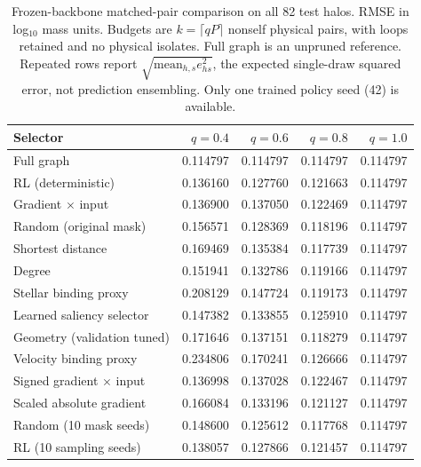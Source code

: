 \begin{table}[t]
\centering
\caption{Frozen-backbone matched-pair comparison on all 82 test halos. RMSE in log$_{10}$ mass units. Budgets are $k=\lceil qP\rceil$ nonself physical pairs, with loops retained and no physical isolates. Full graph is an unpruned reference. Repeated rows report $\sqrt{\mathrm{mean}_{h,s} e_{hs}^2}$, the expected single-draw squared error, not prediction ensembling. Only one trained policy seed (42) is available.}
\label{tab:baseline-robustness}
\begin{tabular}{lrrrr}
\toprule
Selector & $q=0.4$ & $q=0.6$ & $q=0.8$ & $q=1.0$ \\
\midrule
Full graph & 0.114797 & 0.114797 & 0.114797 & 0.114797 \\
RL (deterministic) & 0.136160 & 0.127760 & 0.121663 & 0.114797 \\
Gradient $\times$ input & 0.136900 & 0.137050 & 0.122469 & 0.114797 \\
Random (original mask) & 0.156571 & 0.128369 & 0.118196 & 0.114797 \\
Shortest distance & 0.169469 & 0.135384 & 0.117739 & 0.114797 \\
Degree & 0.151941 & 0.132786 & 0.119166 & 0.114797 \\
Stellar binding proxy & 0.208129 & 0.147724 & 0.119173 & 0.114797 \\
Learned saliency selector & 0.147382 & 0.133855 & 0.125910 & 0.114797 \\
Geometry (validation tuned) & 0.171646 & 0.137151 & 0.118279 & 0.114797 \\
Velocity binding proxy & 0.234806 & 0.170241 & 0.126666 & 0.114797 \\
Signed gradient $\times$ input & 0.136998 & 0.137028 & 0.122467 & 0.114797 \\
Scaled absolute gradient & 0.166084 & 0.133196 & 0.121127 & 0.114797 \\
Random (10 mask seeds) & 0.148600 & 0.125612 & 0.117768 & 0.114797 \\
RL (10 sampling seeds) & 0.138057 & 0.127866 & 0.121457 & 0.114797 \\
\bottomrule
\end{tabular}
\end{table}
